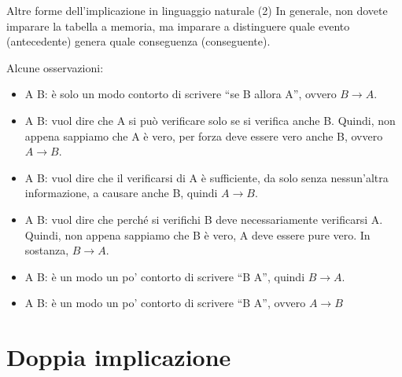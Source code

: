 \documentclass[aspectratio=169,10pt,dvipsnames,handout]{beamer}
\begin{document}
\begin{frame}{Altre forme dell'implicazione in linguaggio naturale (2)}
    In generale, non dovete imparare la tabella a memoria, ma imparare a distinguere quale evento (antecedente) genera quale conseguenza (conseguente).

    \medskip
    Alcune osservazioni:
    \begin{itemize}
        \item A  B: è solo un modo contorto di scrivere ``se B allora A'', ovvero $B \to A$.
        \item A  B: vuol dire che A si può verificare solo se si verifica anche B. Quindi, non appena sappiamo che A è vero, per forza deve essere vero anche B, ovvero $A \to B$.
        \item A  B: vuol dire che il verificarsi di A è sufficiente, da solo senza nessun'altra informazione, a causare anche B, quindi $A \to B$.
        \item A  B: vuol dire che perché si verifichi B deve necessariamente verificarsi A. Quindi, non appena sappiamo che B è vero, A deve essere pure vero. In sostanza, $B \to A$.
        \item  {} A  B: è un modo un po' contorto di scrivere ``B  A'', quindi $B \to A$.
        \item {} A  B: è un modo un po' contorto di scrivere ``B  A'', ovvero $A \to B$
    \end{itemize}
\end{frame}

\section{Doppia implicazione}
\end{document}
